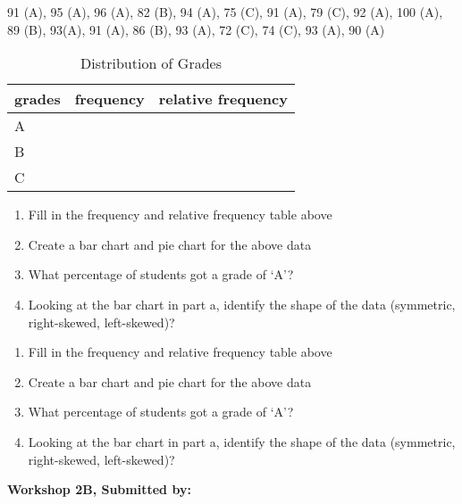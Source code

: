 \documentclass[11pt]{book}\usepackage[]{graphicx}\usepackage[]{color}
\begin{document}
\begin{exercises}
\begin{exercise}
91 (A), 95 (A), 96 (A), 82 (B), 94 (A), 75 (C), 91 (A), 79 (C), 92 (A), 100 (A), 89 (B), 93(A), 91 (A), 86 (B), 93 (A), 72 (C), 74 (C), 93 (A), 90 (A)

\begin{table}[ht]
\centering
\caption{Distribution of Grades}
\begin{tabular}{@{} lcc @{}} \hline
grades & frequency & relative frequency \\ \hline
A  & & \\
B  & & \\
C  & & \\ \hline
\end{tabular}
\end{table}

\begin{enumerate}
  \item Fill in the frequency and relative frequency table above
  \item  Create a bar chart and pie chart for the above data
  \item  What percentage of students got a grade of `A'?
  \item  Looking at the bar chart in part a, identify the shape of the data (symmetric, \\ right-skewed, left-skewed)?
\end{enumerate}

    \end{exercise}
    \begin{solution}  %

  \begin{enumerate}
  \item Fill in the frequency and relative frequency table above
  \item  Create a bar chart and pie chart for the above data
  \item  What percentage of students got a grade of `A'?
  \item  Looking at the bar chart in part a, identify the shape of the data (symmetric, right-skewed, left-skewed)?
\end{enumerate}

    \end{solution}

\clearpage

    \begin{exercise}  %

    \begin{center}
\begin{flushleft}\textbf{\large \hfill Workshop 2B, Submitted by: }\end{flushleft}


\end{center}
\end{exercise}
\end{exercises}
\end{document}

